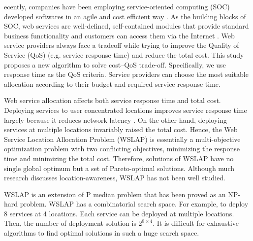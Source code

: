 \documentclass[10pt,journal,compsoc]{IEEEtran}
\begin{document}
\maketitle
\IEEEdisplaynontitleabstractindextext
\IEEEpeerreviewmaketitle

\vspace{-20 mm}


ecently, companies have been employing service-oriented computing (SOC) developed softwares in an agile and cost efficient way \cite{Dan:2008}. 
As the building blocks of SOC, web services are well-defined, self-contained modules that provide standard business functionality and customers can access them via the Internet \cite{Ran}. 
Web service providers always face a tradeoff while trying to improve the Quality of Service (QoS) \cite{Menasce:2002:QIW:613357.613758} (e.g. service response time) and reduce the total cost.
This study proposes a new algorithm to solve cost--QoS trade-off. Specifically, we use response time as the QoS criteria. Service providers can choose the most suitable allocation according to their budget and required service response time.

Web service allocation affects both service response time and total cost. Deploying services to user concentrated locations improves service response time largely because it reduces network latency \cite{916684}. On the other hand, deploying services at multiple locations invariably raised the total cost. Hence, the Web Service Location Allocation Problem (WSLAP) is
essentially a multi-objective optimization problem \cite{Multiobjective} with two conflicting objectives, minimizing the response time and minimizing the total cost. Therefore, 
solutions of WSLAP have no single global optimum but a set of Pareto-optimal solutions. Although much research \cite{7108071} discusses location-awareness, WSLAP has not been well studied.

WSLAP is an extension of P median problem \cite{mladenovic2007p} that has been proved as an NP-hard problem.
WSLAP has a combinatorial search space. For example, to deploy 8 services at 4 locations. Each service can be deployed at multiple locations. Then, the number of deployment solution is $2^{8 \times 4}$. It is difficult for exhaustive algorithms to find optimal solutions in such a huge search space.  
\end{document}
